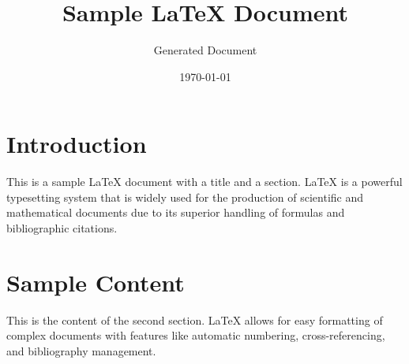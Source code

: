 \documentclass{article}
\title{Sample LaTeX Document}
\author{Generated Document}
\date{\today}
\begin{document}
\maketitle

\section{Introduction}
This is a sample LaTeX document with a title and a section. LaTeX is a powerful typesetting system that is widely used for the production of scientific and mathematical documents due to its superior handling of formulas and bibliographic citations.

\section{Sample Content}
This is the content of the second section. LaTeX allows for easy formatting of complex documents with features like automatic numbering, cross-referencing, and bibliography management.
\end{document}

